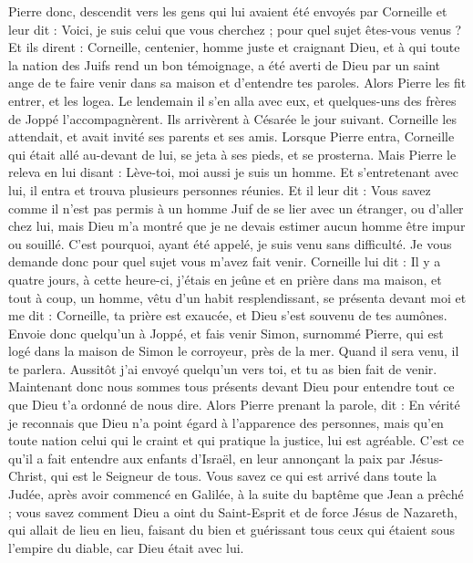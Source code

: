 \begin{multicols}{2}
{Pierre donc, descendit vers les gens qui lui avaient été envoyés par Corneille et leur dit : Voici, je suis celui que vous cherchez ; pour quel sujet êtes-vous venus ?
Et ils dirent : Corneille, centenier, homme juste et craignant Dieu, et à qui toute la nation des Juifs rend un bon témoignage, a été averti de Dieu par un saint ange de te faire venir dans sa maison et d'entendre tes paroles.
Alors Pierre les fit entrer, et les logea. Le lendemain il s'en alla avec eux, et quelques-uns des frères de Joppé l'accompagnèrent.
Ils arrivèrent à Césarée le jour suivant. Corneille les attendait, et avait invité ses parents et ses amis.
Lorsque Pierre entra, Corneille qui était allé au-devant de lui, se jeta à ses pieds, et se prosterna.
Mais Pierre le releva en lui disant : Lève-toi, moi aussi je suis un homme.
Et s'entretenant avec lui, il entra et trouva plusieurs personnes réunies.
Et il leur dit : Vous savez comme il n'est pas permis à un homme Juif de se lier avec un étranger, ou d'aller chez lui, mais Dieu m'a montré que je ne devais estimer aucun homme être impur ou souillé.
C'est pourquoi, ayant été appelé, je suis venu sans difficulté. Je vous demande donc pour quel sujet vous m'avez fait venir.
Corneille lui dit : Il y a quatre jours, à cette heure-ci, j'étais en jeûne et en prière dans ma maison, et tout à coup, un homme, vêtu d'un habit resplendissant, se présenta devant moi et me dit :
Corneille, ta prière est exaucée, et Dieu s'est souvenu de tes aumônes.
Envoie donc quelqu'un à Joppé, et fais venir Simon, surnommé Pierre, qui est logé dans la maison de Simon le corroyeur, près de la mer. Quand il sera venu, il te parlera.
Aussitôt j'ai envoyé quelqu'un vers toi, et tu as bien fait de venir. Maintenant donc nous sommes tous présents devant Dieu pour entendre tout ce que Dieu t'a ordonné de nous dire.
Alors Pierre prenant la parole, dit : En vérité je reconnais que Dieu n'a point égard à l'apparence des personnes,
mais qu'en toute nation celui qui le craint et qui pratique la justice, lui est agréable.
C'est ce qu'il a fait entendre aux enfants d'Israël, en leur annonçant la paix par Jésus-Christ, qui est le Seigneur de tous.
Vous savez ce qui est arrivé dans toute la Judée, après avoir commencé en Galilée, à la suite du baptême que Jean a prêché ;
vous savez comment Dieu a oint du Saint-Esprit et de force Jésus de Nazareth, qui allait de lieu en lieu, faisant du bien et guérissant tous ceux qui étaient sous l'empire du diable, car Dieu était avec lui.
}
\end{multicols}
